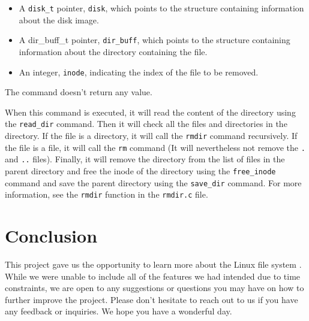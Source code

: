 \documentclass{article}
\begin{document}
\begin{itemize}
    \item A \texttt{disk\_t} pointer, \texttt{disk}, which points to the structure containing information about the disk image.
    \item A dir\_buff\_t pointer, \texttt{dir\_buff}, which points to the structure containing information about the directory containing the file.
    \item An integer, \texttt{inode}, indicating the index of the file to be removed.
\end{itemize}

The command doesn't return any value.

When this command is executed, it will read the content of the directory using the \texttt{read\_dir} command. Then it will check all the files and directories in the directory. If the file is a directory, it will call the \texttt{rmdir} command recursively. If the file is a file, it will call the \texttt{rm} command (It will nevertheless not remove the \texttt{.} and \texttt{..} files). Finally, it will remove the directory from the list of files in the parent directory and free the inode of the directory using the \texttt{free\_inode} command and save the parent directory using the \texttt{save\_dir} command. For more information, see the \texttt{rmdir} function in the \texttt{rmdir.c} file.

\section{Conclusion}

This project gave us the opportunity to learn more about the Linux file system . While we were unable to include all of the features we had intended due to time constraints, we are open to any suggestions or questions you may have on how to further improve the project. Please don't hesitate to reach out to us if you have any feedback or inquiries. We hope you have a wonderful day.
\end{document}
